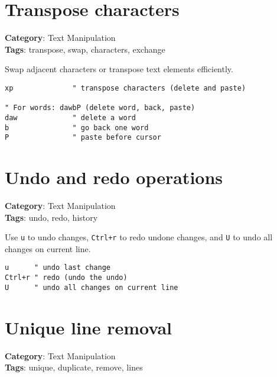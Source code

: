 {{{{{{{{{{{{{{{\section{Transpose characters}

\textbf{Category}: Text Manipulation\\ \textbf{Tags}: transpose, swap, characters, exchange
\vspace{0.5cm}

Swap adjacent characters or transpose text elements efficiently.

\begin{Exa*}{}
\begin{Verbatim}[fontsize=\footnotesize, breaklines, breakanywhere]
xp              " transpose characters (delete and paste)

" For words: dawbP (delete word, back, paste)
daw             " delete a word  
b               " go back one word
P               " paste before cursor
\end{Verbatim}
\end{Exa*}

\section{Undo and redo operations}

\textbf{Category}: Text Manipulation\\ \textbf{Tags}: undo, redo, history
\vspace{0.5cm}

Use {\footnotesize \Verb§u§} to undo changes, {\footnotesize \Verb§Ctrl+r§} to redo undone changes, and {\footnotesize \Verb§U§} to undo all changes on current line.

\begin{Exa*}{}
\begin{Verbatim}[fontsize=\footnotesize, breaklines, breakanywhere]
u      " undo last change
Ctrl+r " redo (undo the undo)
U      " undo all changes on current line
\end{Verbatim}
\end{Exa*}

\section{Unique line removal}

\textbf{Category}: Text Manipulation\\ \textbf{Tags}: unique, duplicate, remove, lines
\vspace{0.5cm}

}}}}}}}}}}}}}}}
